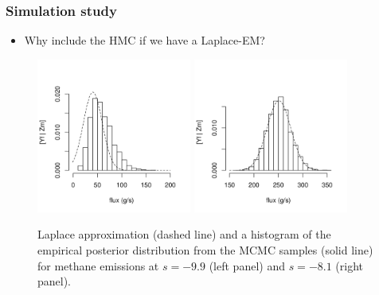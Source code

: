 \documentclass{beamer}
\begin{document}
\begin{frame}
\frametitle{Simulation study}
\begin{itemize}
\item Why include the HMC if we have a Laplace-EM?
\end{itemize}
\begin{center}
\vspace{-0.5cm}
\begin{figure}
\includegraphics[width=2in]{density_sim1.png}
\includegraphics[width=2in]{density_sim10.png}
	\caption{Laplace approximation (dashed line) and a histogram of the empirical posterior distribution from the MCMC samples (solid line) for methane emissions at $s = -9.9$ (left panel) and $s = -8.1$ (right panel).}
\end{figure}
\end{center}
\end{frame}
\end{document}

